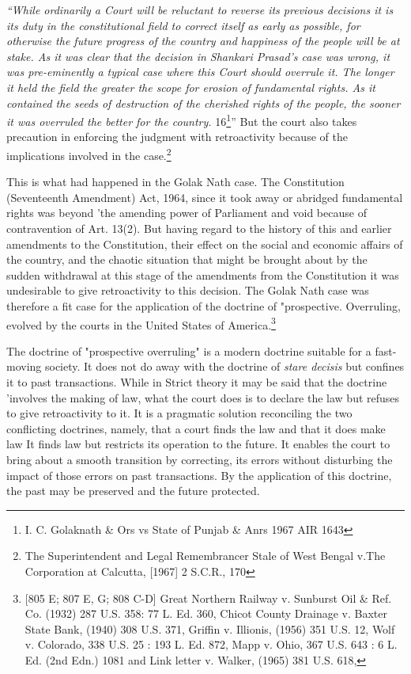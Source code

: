 \begin{multicols}{2}
\noi
\textit{“While ordinarily a Court will be reluctant to reverse its previous decisions it is its duty
in the constitutional field to correct itself as early as possible, for otherwise the future
progress of the country and happiness of the people will be at stake. As it was clear that
the decision in Shankari Prasad's case was wrong, it was pre-eminently a typical case
where this Court should overrule it. The longer it held the field the greater the scope
for erosion of fundamental rights. As it contained the seeds of destruction of the
cherished rights of the people, the sooner it was overruled the better for the country.}
16\footnote{I. C. Golaknath \& Ors vs State of Punjab \& Anrs 1967 AIR 1643}”
But the court also takes precaution in enforcing the judgment with retroactivity because
of the implications involved in the case.\footnote{The Superintendent and Legal Remembrancer Stale of West Bengal v.The Corporation at Calcutta,
[1967] 2 S.C.R., 170}

\noi
This is what had happened in the Golak Nath case. The Constitution (Seventeenth
Amendment) Act, 1964, since it took away or abridged fundamental rights was beyond
'the amending power of Parliament and void because of contravention of Art. 13(2).
But having regard to the history of this and earlier amendments to the Constitution,
their effect on the social and economic affairs of the country, and the chaotic situation
that might be brought about by the sudden withdrawal at this stage of the amendments
from the Constitution it was undesirable to give retroactivity to this decision. The Golak
Nath case was therefore a fit case for the application of the doctrine of "prospective.
Overruling, evolved by the courts in the United States of America.\footnote{ [805 E; 807 E, G; 808 C-D] Great Northern Railway v. Sunburst Oil \& Ref. Co. (1932) 287 U.S. 358:
77 L. Ed. 360, Chicot County Drainage v. Baxter State Bank, (1940) 308 U.S. 371, Griffin v. Illionis, (1956) 351 U.S. 12, Wolf v. Colorado, 338 U.S. 25 : 193 L. Ed. 872, Mapp v. Ohio, 367 U.S. 643 : 6 L.
Ed. (2nd Edn.) 1081 and Link letter v. Walker, (1965) 381 U.S. 618, }


\noi
The doctrine of "prospective overruling" is a modern doctrine suitable for a fast-moving
society. It does not do away with the doctrine of \textit{stare decisis} but confines it to past
transactions. While in Strict theory it may be said that the doctrine 'involves the making
of law, what the court does is to declare the law but refuses to give retroactivity to it. It
is a pragmatic solution reconciling the two conflicting doctrines, namely, that a court
finds the law and that it does make law It finds law but restricts its operation to the
future. It enables the court to bring about a smooth transition by correcting, its errors
without disturbing the impact of those errors on past transactions. By the application of
this doctrine, the past may be preserved and the future protected. 



\end{multicols}
